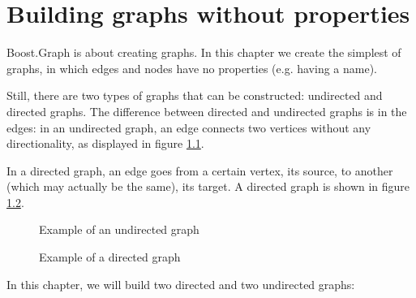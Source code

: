 \chapter{Building graphs without properties}
\label{sec:Building-graphs-without-properties}

Boost.Graph is about creating graphs.
In this chapter we create the simplest of graphs, in which edges and nodes
have no properties (e.g. having a name).

Still, there are two types of graphs that can be constructed: undirected
and directed graphs.
The difference between directed and undirected graphs is in the edges:
in an undirected graph, 
an edge connects two vertices without any directionality, as displayed
in figure \ref{fig:undirected_graph_example}.

In a directed graph, an edge goes from a certain vertex, 
its source, to another (which may actually be the same), its target.
A directed graph is shown in figure \ref{fig:directed_graph_example}.

\begin{figure}
  \caption{Example of an undirected graph}
  \label{fig:undirected_graph_example}
\end{figure}

\begin{figure}
  \caption{Example of a directed graph}
  \label{fig:directed_graph_example}
\end{figure}

In this chapter, we will build two directed and two undirected graphs:

